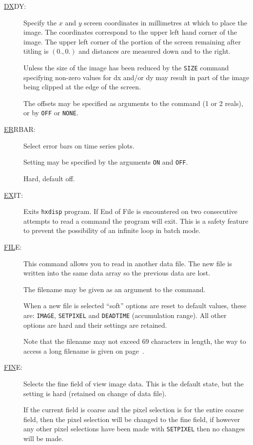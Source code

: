 \begin{description}
\item[\underline{DX}DY: ] \label{dx}
Specify the $x$ and $y$ screen coordinates in millimetres at which to
place the image. The coordinates correspond to the upper left hand
corner of the image. The upper left corner of the portion of the screen
remaining after titling is $(0., 0.)$ and distances are measured down
and to the right.

Unless the size of the image has been reduced by the {\tt SIZE} command
specifying non-zero values for dx and/or dy may result in part of the
image being clipped at the edge of the screen.

The offsets may be specified as arguments to the command (1 or 2
reals), or by {\tt OFF} or {\tt NONE}.

\item[\underline{ER}RBAR: ] \label{er}
Select error bars on time series plots.

Setting may be specified by the arguments {\tt ON} and {\tt OFF}.

Hard, default off.

\item[\underline{EX}IT: ] \label{ex}
Exits \verb!hxdisp! program.  If End of File is encountered on two
consecutive attempts to read a command the program will exit. This is a
safety feature to prevent the possibility of an infinite loop in batch
mode.

\item[\underline{FIL}E: ] \label{fil}
This command allows you to read in another data file. The new file is
written into the same data array so the previous data are lost.

The filename may be given as an argument to the command.

When a new file is selected ``soft'' options are reset to default
values, these are: {\tt IMAGE}, {\tt SETPIXEL} and {\tt DEADTIME}
(accumulation range). All other options are hard and their settings are
retained.

Note that the filename may not exceed 69 characters in length, the way
to access a long filename is given on page~\pageref{longname}.

\item[\underline{FIN}E: ] \label{fin}
Selects the fine field of view image data.  This is the default state,
but the setting is hard (retained on change of data file).

If the current field is coarse and the pixel selection is for the
entire coarse field, then the pixel selection will be changed to the
fine field, if however any other pixel selections have been made with
{\tt SETPIXEL} then no changes will be made.


\end{description}
